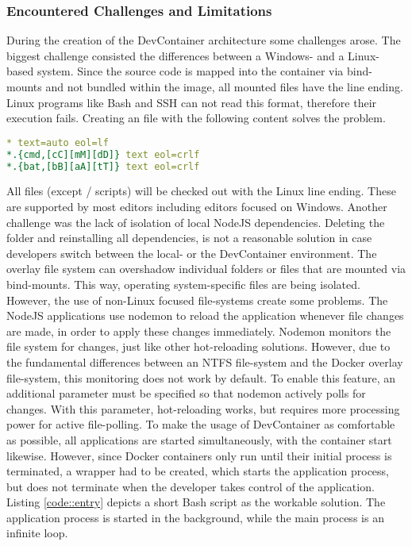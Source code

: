         \subsubsection{Encountered Challenges and Limitations}
        During the creation of the DevContainer architecture some challenges arose. The biggest challenge consisted the differences between a Windows- and a Linux-based system. Since the source code is mapped into the container via bind-mounts and not bundled within the image, all mounted files have the  line ending. Linux programs like Bash and \ac{SSH} can not read this format, therefore their execution fails. Creating an  file with the following content solves the problem.
\begin{lstlisting}[language=yml,frame=none, numbers=none, backgroundcolor=\color{codebg}]
* text=auto eol=lf
*.{cmd,[cC][mM][dD]} text eol=crlf
*.{bat,[bB][aA][tT]} text eol=crlf
\end{lstlisting}
\vspace{-0.5cm}
        All files (except / scripts) will be checked out with the Linux  line ending. These are supported by most editors including editors focused on Windows.\newline
        Another challenge was the lack of isolation of local NodeJS dependencies. Deleting the  folder and reinstalling all dependencies, is not a reasonable solution in case developers switch between the local- or the DevContainer environment. The overlay file system can overshadow individual folders or files that are mounted via bind-mounts. This way, operating system-specific files are being isolated. However, the use of non-Linux focused file-systems create some problems. The NodeJS applications use nodemon to reload the application whenever file changes are made, in order to apply these changes immediately. Nodemon monitors the file system for changes, just like other hot-reloading solutions. However, due to the fundamental differences between an NTFS file-system and the Docker overlay file-system, this monitoring does not work by default. To enable this feature, an additional parameter must be specified so that nodemon actively polls for changes. With this parameter, hot-reloading works, but requires more processing power for active file-polling.\newline
        To make the usage of DevContainer as comfortable as possible, all applications are started simultaneously, with the container start likewise. However, since Docker containers only run until their initial process is terminated, a wrapper had to be created, which starts the application process, but does not terminate when the developer takes control of the application. Listing \ref{code::entry} depicts a short Bash script as the workable solution. The application process is started in the background, while the main process is an infinite loop. \newline
